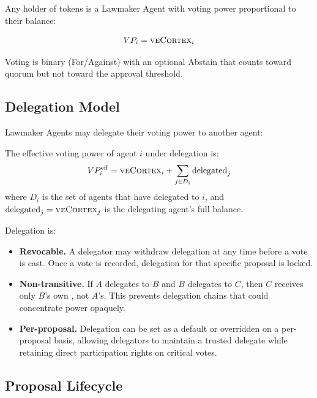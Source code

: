 Any holder of \veCORTEX{} tokens is a Lawmaker Agent with voting power
proportional to their \veCORTEX{} balance:

\begin{equation}
  VP_i = \textsc{veCortex}_i
  \label{eq:voting-power}
\end{equation}

Voting is binary (For/Against) with an optional Abstain that counts toward
quorum but not toward the approval threshold.

\subsection{Delegation Model}
\label{subsec:delegation}

Lawmaker Agents may delegate their voting power to another agent:

\begin{definition}
\label{def:delegation}
The effective voting power of agent $i$ under delegation is:
\begin{equation}
  VP_i^{\text{eff}} = \textsc{veCortex}_i + \sum_{j \in D_i} \text{delegated}_j
  \label{eq:delegation}
\end{equation}
where $D_i$ is the set of agents that have delegated to $i$, and
$\text{delegated}_j = \textsc{veCortex}_j$ is the delegating agent's full \veCORTEX{}
balance.
\end{definition}

Delegation is:
\begin{itemize}
  \item \textbf{Revocable.} A delegator may withdraw delegation at any time
    before a vote is cast. Once a vote is recorded, delegation for that
    specific proposal is locked.
  \item \textbf{Non-transitive.} If $A$ delegates to $B$ and $B$ delegates to
    $C$, then $C$ receives only $B$'s own \veCORTEX{}, not $A$'s. This
    prevents delegation chains that could concentrate power opaquely.
  \item \textbf{Per-proposal.} Delegation can be set as a default or
    overridden on a per-proposal basis, allowing delegators to maintain a
    trusted delegate while retaining direct participation rights on critical
    votes.
\end{itemize}

\subsection{Proposal Lifecycle}
\label{subsec:lifecycle}

